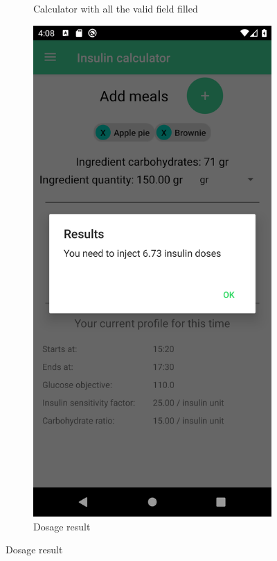 \begin{figure}[H]
\begin{center}
\begin{subfigure}{.3\textwidth}
            \caption{Calculator with all the valid field filled} 
        \end{subfigure}
        \begin{subfigure}{.3\textwidth}
            \includegraphics[scale=0.1, width=\textwidth]{_figures/dosage_result.png}
            \caption{Dosage result\\} 
        \end{subfigure}%
    \end{center}
\end{figure}

